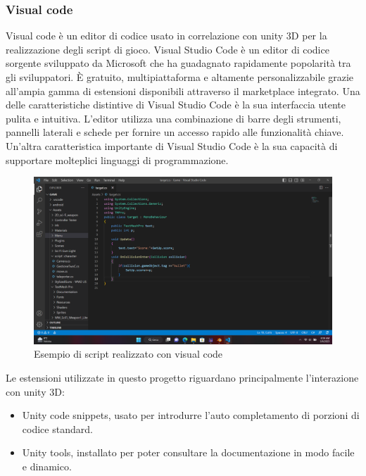 \documentclass[10pt,a4paper]{article}
\begin{document}
    \subsubsection{Visual code}
    Visual code è un editor di codice usato in correlazione con unity 3D per la realizzazione degli script di gioco.
    Visual Studio Code è un editor di codice sorgente sviluppato da Microsoft che ha guadagnato rapidamente popolarità tra gli sviluppatori. È gratuito, multipiattaforma e altamente personalizzabile grazie all'ampia gamma di estensioni disponibili attraverso il marketplace integrato.
    Una delle caratteristiche distintive di Visual Studio Code è la sua interfaccia utente pulita e intuitiva. L'editor utilizza una combinazione di barre degli strumenti, pannelli laterali e schede per fornire un accesso rapido alle funzionalità chiave.
    Un'altra caratteristica importante di Visual Studio Code è la sua capacità di supportare molteplici linguaggi di programmazione.
    \begin{figure}[H]
    	\centering
    	\includegraphics[width=0.8\linewidth]{image/visual_code}
    	\caption{Esempio di script realizzato con visual code}
    	\label{fig:visual_code}
    \end{figure}
    Le estensioni utilizzate in questo progetto riguardano principalmente l'interazione con unity 3D:
    \begin{itemize}
    	\item Unity code snippets, usato per introdurre l'auto completamento di porzioni di codice standard.
    	\item Unity tools, installato per poter consultare la documentazione in modo facile e dinamico. 
    \end{itemize}
\end{document}
